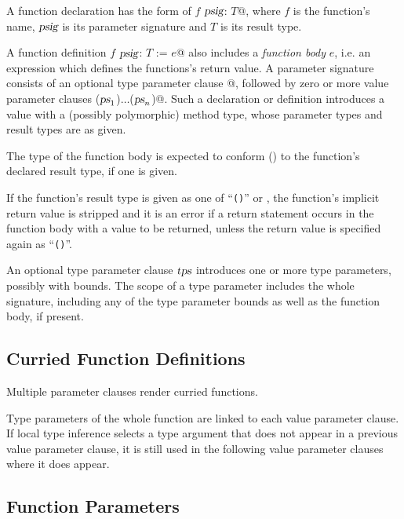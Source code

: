 A function declaration has the form of \lstinline@def $f$ $\mbox{\sl psig}$: $T$@, where $f$ is the function's name, $\mbox{\sl psig}$ is its parameter signature and $T$ is its result type. 

A function definition \lstinline@def $f$ $\mbox{\sl psig}$: $T$ := $e$@ also includes a {\em function body} $e$, i.e. an expression which defines the functions's return value. A parameter signature consists of an optional type parameter clause \lstinline@[$\tps$]@, followed by zero or more value parameter clauses \lstinline@($\mbox{\sl ps}_1$)$\ldots$($\mbox{\sl ps}_n$)@. Such a declaration or definition introduces a value with a (possibly polymorphic) method type, whose parameter types and result types are as given. 

The type of the function body is expected to conform () to the function's declared result type, if one is given. 

If the function's result type is given as one of ``\lstinline!()!'' or , the function's implicit return value is stripped and it is an error if a return statement occurs in the function body with a value to be returned, unless the return value is specified again as ``\lstinline!()!''.

An optional type parameter clause $\tps$ introduces one or more type parameters, possibly with bounds. The scope of a type parameter includes the whole signature, including any of the type parameter bounds as well as the function body, if present. 






\subsection{Curried Function Definitions}

Multiple parameter clauses render curried functions. 

Type parameters of the whole function are linked to each value parameter clause. If local type inference selects a type argument that does not appear in a previous value parameter clause, it is still used in the following value parameter clauses where it does appear. 






\subsection{Function Parameters}

